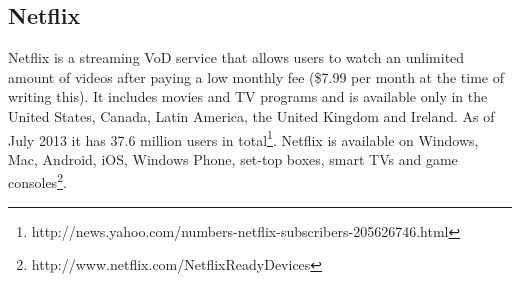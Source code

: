 \subsection{Netflix}
Netflix is a streaming VoD service that allows users to watch an unlimited amount of videos after paying a low monthly fee (\$7.99 per month at the time of writing this). It includes movies and TV programs and is available only in the United States, Canada, Latin America, the United Kingdom and Ireland. As of July 2013 it has 37.6 million users in total\footnote{http://news.yahoo.com/numbers-netflix-subscribers-205626746.html}. Netflix is available on Windows, Mac, Android, iOS, Windows Phone, set-top boxes, smart TVs and game consoles\footnote{http://www.netflix.com/NetflixReadyDevices}.